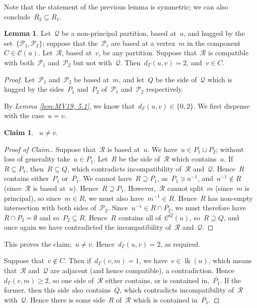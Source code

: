 \documentclass[11pt]{amsart}
\theoremstyle{definition}
\theoremstyle{definition}
\theoremstyle{definition}
\theoremstyle{definition}
\newtheorem*{claim*}{Claim}
\newtheorem{lemma}[theorem]{Lemma}
\newcommand{\calC}{\mathcal{C}}
\newcommand{\calQ}{\mathcal{Q}}
\newcommand{\calP}{\mathcal{P}} %
\newcommand{\calR}{\mathcal{R}} %
\newcommand{\link}[1]{\operatorname{lk}({#1})} %
\begin{document}
Note that the statement of the previous lemma is symmetric; we can also conclude~$\overline{R_2} \subseteq \overline{R_1}$.

\begin{lemma}\label{lem:Lemma A, pg 87}
    Let~$\calQ$ be a non-principal partition, based at~$u$, and hugged by the set~$\{\calP_1, \calP_2\}$; suppose that the~$\calP_i$ are based at a vertex~$m$ in the component~$C \in \calC(u)$. Let~$\calR$, based at~$v$, be any partition. Suppose that~$\calR$ is compatible with both~$\calP_1$ and~$\calP_2$ but not with~$\calQ$. Then~$d_\Gamma(u, v) = 2$, and~$v \in C$.
\end{lemma}

\begin{proof}
    Let~$\calP_1$ and~$\calP_2$ be based at~$m$, and let~$Q$ be the side of~$\calQ$ which is hugged by the sides~$P_1$ and~$P_2$ of~$\calP_1$ and~$\calP_2$ respectively.
    
    By \emph{Lemma \ref{lem:MV19, 5.1}}, we know that~$d_\Gamma(u, v) \in \{0, 2\}$. We first dispense with the case~$u = v$.

    \begin{claim*}
        ~$u \neq v$.
    \end{claim*}

    \begin{proof}[Proof of Claim.]
        Suppose that~$\calR$ is based at~$u$. We have~$u \in P_1 \sqcup P_2$; without loss of generality take~$u \in P_1$. Let~$R$ be the side of~$\calR$ which contains~$u$. If~$R \subseteq P_1$, then~$R \subseteq Q$, which contradicts incompatibility of~$\calR$ and~$\calQ$. Hence~$R$ contains either~$P_1$ or~$\overline{P_1}$. We cannot have~$R \supseteq \overline{P_1}$, as~$\overline{P_1} \ni u^{-1}$, and~$u^{-1} \notin R$ (since~$\calR$ is based at~$u$). Hence~$R \supseteq P_1$. However,~$\calR$ cannot split~$m$ (since~$m$ is principal), so since~$m \in R$, we must also have~$m^{-1} \in R$. Hence~$R$ has non-empty intersection with both sides of~$\calP_2$. Since~$u^{-1} \in \overline{R} \cap \overline{P_2}$, we must therefore have~$\overline{R} \cap P_2 = \emptyset$ and so~$P_2 \subseteq R$. Hence~$R$ contains all of~$\calC^Q(u)$, so~$R \supseteq Q$, and once again we have contradicted the incompatibility of~$\calR$ and~$\calQ$. 
    \end{proof}


    This proves the claim;~$u \neq v$. Hence~$d_\Gamma(u, v) = 2$, as required.

    Suppose that~$v \notin C$. Then if~$d_\Gamma(v, m) = 1$, we have~$v \in \link{u}$, which means that~$\calR$ and~$\calQ$ are adjacent (and hence compatible), a contradiction. Hence~$d_\Gamma(v, m) \geq 2$, so one side of~$\calR$ either contains, or is contained in,~$\overline{P_1}$. If the former, then this side also contains~$\overline{Q}$, which contradicts incompatibility of~$\calR$ with~$\calQ$. Hence there is some side~$R$ of~$\calR$ which is contained in~$\overline{P_1}$. 
    

\end{proof}
\end{document}
